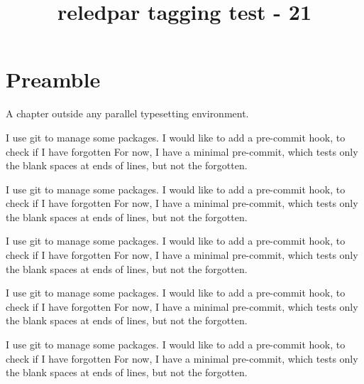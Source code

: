 \documentclass{book}
\title{reledpar tagging test - 21}
\begin{document}
\tableofcontents

\beforeeledchapter

\chapter{Preamble}
A chapter outside any parallel typesetting environment.

\begin{pages}
\begin{Leftside}
\beginnumbering
\pstart
{}
\pend

\pstart
I use git to manage some packages.
I would like to add a pre-commit hook, to check if I have forgotten
For now, I have a minimal pre-commit, which tests only the blank spaces at ends of lines, but not the forgotten.
\pend

\pstart
{}
\pend

\pstart
{}
\pend

\pstart
{}
\pend

\pstart
I use git to manage some packages.
I would like to add a pre-commit hook, to check if I have forgotten
For now, I have a minimal pre-commit, which tests only the blank spaces at ends of lines, but not the forgotten.
\pend

\pstart
{}
\pend

\pstart
I use git to manage some packages.
I would like to add a pre-commit hook, to check if I have forgotten
For now, I have a minimal pre-commit, which tests only the blank spaces at ends of lines, but not the forgotten.
\pend

\pstart
I use git to manage some packages.
I would like to add a pre-commit hook, to check if I have forgotten
For now, I have a minimal pre-commit, which tests only the blank spaces at ends of lines, but not the forgotten.
\pend

\pstart
{}
\pend

\pstart
{}
\pend

\pstart
{}
\pend

\pstart
I use git to manage some packages.
I would like to add a pre-commit hook, to check if I have forgotten
For now, I have a minimal pre-commit, which tests only the blank spaces at ends of lines, but not the forgotten.
\pend


\end{Leftside}
\end{pages}
\end{document}

